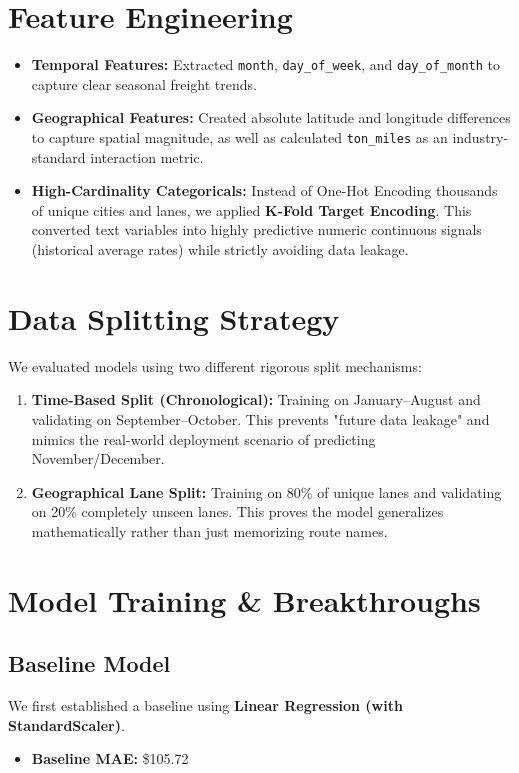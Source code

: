 \documentclass{article}
\begin{document}
\section{Feature Engineering}
\begin{itemize}
    \item \textbf{Temporal Features:} Extracted \texttt{month}, \texttt{day\_of\_week}, and \texttt{day\_of\_month} to capture clear seasonal freight trends.
    \item \textbf{Geographical Features:} Created absolute latitude and longitude differences to capture spatial magnitude, as well as calculated \texttt{ton\_miles} as an industry-standard interaction metric.
    \item \textbf{High-Cardinality Categoricals:} Instead of One-Hot Encoding thousands of unique cities and lanes, we applied \textbf{K-Fold Target Encoding}. This converted text variables into highly predictive numeric continuous signals (historical average rates) while strictly avoiding data leakage.
\end{itemize}

\section{Data Splitting Strategy}
We evaluated models using two different rigorous split mechanisms:
\begin{enumerate}
    \item \textbf{Time-Based Split (Chronological):} Training on January--August and validating on September--October. This prevents "future data leakage" and mimics the real-world deployment scenario of predicting November/December.
    \item \textbf{Geographical Lane Split:} Training on 80\% of unique lanes and validating on 20\% completely unseen lanes. This proves the model generalizes mathematically rather than just memorizing route names.
\end{enumerate}

\section{Model Training \& Breakthroughs}
\subsection{Baseline Model}
We first established a baseline using \textbf{Linear Regression (with StandardScaler)}. 
\begin{itemize}
    \item \textbf{Baseline MAE:} \$105.72
\end{itemize}
\end{document}
